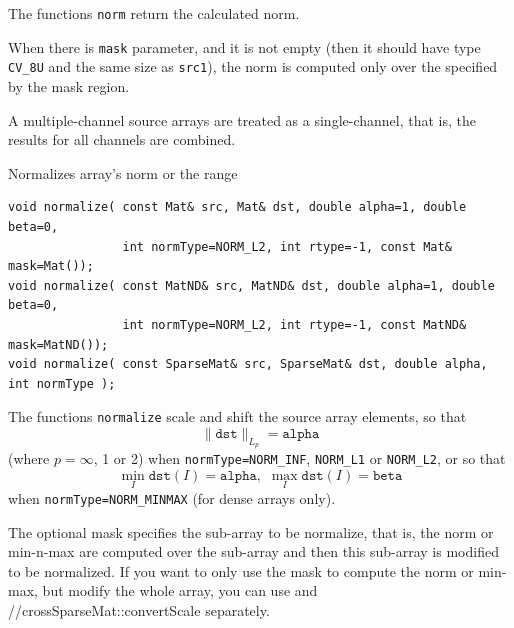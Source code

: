 The functions \texttt{norm} return the calculated norm.

When there is \texttt{mask} parameter, and it is not empty (then it should have type \texttt{CV\_8U} and the same size as \texttt{src1}), the norm is computed only over the specified by the mask region.

A multiple-channel source arrays are treated as a single-channel, that is, the results for all channels are combined.


\label{normalize}
Normalizes array's norm or the range

\begin{lstlisting}
void normalize( const Mat& src, Mat& dst, double alpha=1, double beta=0,
                int normType=NORM_L2, int rtype=-1, const Mat& mask=Mat());
void normalize( const MatND& src, MatND& dst, double alpha=1, double beta=0,
                int normType=NORM_L2, int rtype=-1, const MatND& mask=MatND());
void normalize( const SparseMat& src, SparseMat& dst, double alpha, int normType );
\end{lstlisting}
\begin{description}
\end{description}

The functions \texttt{normalize} scale and shift the source array elements, so that
\[\|\texttt{dst}\|_{L_p}=\texttt{alpha}\]
(where $p=\infty$, 1 or 2) when \texttt{normType=NORM\_INF}, \texttt{NORM\_L1} or \texttt{NORM\_L2},
or so that
\[\min_I \texttt{dst}(I)=\texttt{alpha},\,\,\max_I \texttt{dst}(I)=\texttt{beta}\]
when \texttt{normType=NORM\_MINMAX} (for dense arrays only).

The optional mask specifies the sub-array to be normalize, that is, the norm or min-n-max are computed over the sub-array and then this sub-array is modified to be normalized. If you want to only use the mask to compute the norm or min-max, but modify the whole array, you can use  and //cross{SparseMat::convertScale} separately.

